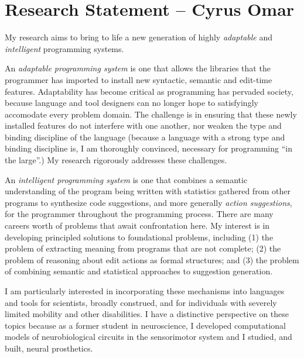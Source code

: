 \documentclass[9pt]{extarticle}
\begin{document}
\vspace{-8px}
\section*{Research Statement -- Cyrus Omar}
\vspace{-6px}
My research aims to bring to life a new generation of highly \emph{adaptable} and \emph{intelligent} programming systems.

An \emph{adaptable programming system} is one that allows the libraries that the programmer has imported to install new syntactic, semantic and edit-time features. Adaptability has become critical as programming has pervaded society, because language and tool designers can no longer hope to satisfyingly accomodate every problem domain. The challenge is in ensuring that these newly installed features do not interfere with one another, nor weaken the type and binding discipline of the language (because a language with a strong type and binding discipline is, I am thoroughly convinced, necessary for programming ``in the large''.) My research rigorously addresses these challenges.  %

An \emph{intelligent programming system} is one that combines a semantic understanding of the program being written with statistics gathered from other programs to synthesize code suggestions, and more generally \emph{action suggestions}, for the programmer throughout the programming process. There are many careers worth of problems that await confrontation here. My interest is in developing principled solutions to foundational problems, including (1) the problem of extracting meaning from programs that are not complete; (2) the problem of reasoning about edit actions as formal structures; and (3) the problem of combining semantic and statistical approaches to suggestion generation.

I am particularly interested in incorporating these mechanisms into languages and tools for scientists, broadly construed, and for individuals with severely limited mobility and other disabilities. I have a distinctive perspective on these topics because as a former student in neuroscience, I developed computational models of neurobiological circuits in the sensorimotor system and I studied, and built, neural prosthetics.
\end{document}
